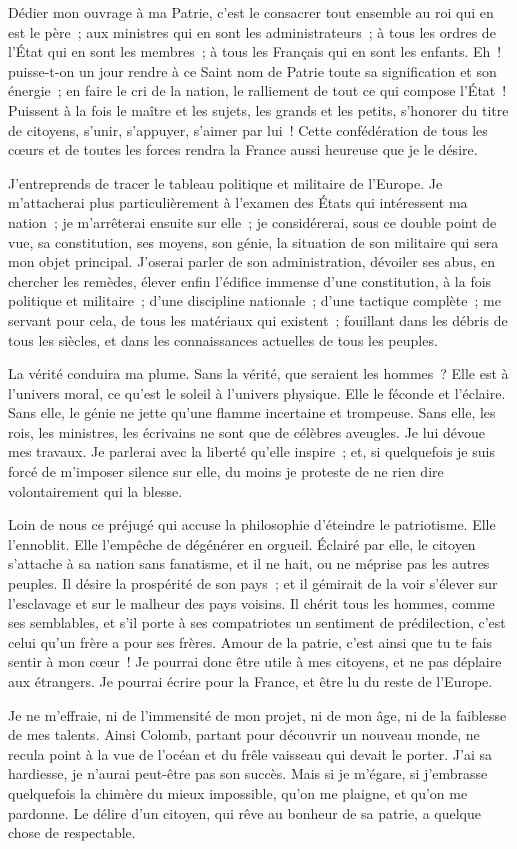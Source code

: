 \documentclass[french,twoside]{book} %
\begin{document}
\noindent Dédier mon ouvrage à ma Patrie, c’est le consacrer tout ensemble au roi qui en est le père ; aux ministres qui en sont les administrateurs ; à tous les ordres de l’État qui en sont les membres ; à tous les Français qui en sont les enfants. Eh ! puisse-t-on un jour rendre à ce Saint nom de Patrie toute sa signification et son énergie ; en faire le cri de la nation, le ralliement de tout ce qui compose l’État ! Puissent à la fois le maître et les sujets, les grands et les petits, s’honorer du titre de citoyens, s’unir, s’appuyer, s’aimer par lui ! Cette confédération de tous les cœurs et de toutes les forces rendra la France aussi heureuse que je le désire.\par
J’entreprends de tracer le tableau politique et militaire de l’Europe. Je m’attacherai plus particulièrement à l’examen des États qui intéressent ma nation ; je m’arrêterai ensuite sur elle ; je considérerai, sous ce double point de vue, sa constitution, ses moyens, son génie, la situation de son militaire qui sera mon objet principal. J’oserai parler de son administration, dévoiler ses abus, en chercher les remèdes, élever enfin l’édifice immense d’une constitution, à la fois politique et militaire ; d’une discipline nationale ; d’une tactique complète ; me servant pour cela, de tous les matériaux qui existent ; fouillant dans les débris de tous les siècles, et dans les connaissances actuelles de tous les peuples.\par
La vérité conduira ma plume. Sans la vérité, que seraient les hommes ? Elle est à l’univers moral, ce qu’est le soleil à l’univers physique. Elle le féconde et l’éclaire. Sans elle, le génie ne jette qu’une flamme incertaine et trompeuse. Sans elle, les rois, les ministres, les écrivains ne sont que de célèbres aveugles. Je lui dévoue mes travaux. Je parlerai avec la liberté qu’elle inspire ; et, si quelquefois je suis forcé de m’imposer silence sur elle, du moins je proteste de ne rien dire volontairement qui la blesse.\par
Loin de nous ce préjugé qui accuse la philosophie d’éteindre le patriotisme. Elle l’ennoblit. Elle l’empêche de dégénérer en orgueil. Éclairé par elle, le citoyen s’attache à sa nation sans fanatisme, et il ne hait, ou ne méprise pas les autres peuples. Il désire la prospérité de son pays ; et il gémirait de la voir s’élever sur l’esclavage et sur le malheur des pays voisins. Il chérit tous les hommes, comme ses semblables, et s’il porte à ses compatriotes un sentiment de prédilection, c’est celui qu’un frère a pour ses frères. Amour de la patrie, c’est ainsi que tu te fais sentir à mon cœur ! Je pourrai donc être utile à mes citoyens, et ne pas déplaire aux étrangers. Je pourrai écrire pour la France, et être lu du reste de l’Europe.\par
Je ne m’effraie, ni de l’immensité de mon projet, ni de mon âge, ni de la faiblesse de mes talents. Ainsi Colomb, partant pour découvrir un nouveau monde, ne recula point à la vue de l’océan et du frêle vaisseau qui devait le porter. J’ai sa hardiesse, je n’aurai peut-être pas son succès. Mais si je m’égare, si j’embrasse quelquefois la chimère du mieux impossible, qu’on me plaigne, et qu’on me pardonne. Le délire d’un citoyen, qui rêve au bonheur de sa patrie, a quelque chose de respectable.
\end{document}
